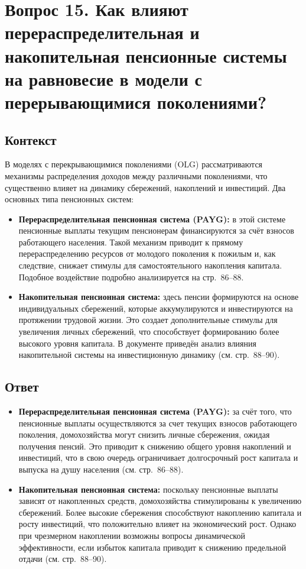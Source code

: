 \section*{Вопрос 15. Как влияют перераспределительная и накопительная пенсионные системы на равновесие в модели с перерывающимися поколениями?}

\subsection*{Контекст}
В моделях с перекрывающимися поколениями (OLG) рассматриваются механизмы распределения доходов между различными 
поколениями, что существенно влияет на динамику сбережений, накоплений и инвестиций. Два основных типа пенсионных систем:
\begin{itemize}
  \item \textbf{Перераспределительная пенсионная система (PAYG):} в этой системе пенсионные выплаты текущим пенсионерам 
  финансируются за счёт взносов работающего населения. Такой механизм приводит к прямому перераспределению ресурсов от 
  молодого поколения к пожилым и, как следствие, снижает стимулы для самостоятельного накопления капитала. Подобное 
  воздействие подробно анализируется на стр.~86--88.
  \item \textbf{Накопительная пенсионная система:} здесь пенсии формируются на основе индивидуальных сбережений, 
  которые аккумулируются и инвестируются на протяжении трудовой жизни. Это создает дополнительные стимулы для увеличения 
  личных сбережений, что способствует формированию более высокого уровня капитала. В документе приведён анализ влияния 
  накопительной системы на инвестиционную динамику (см. стр.~88--90).
\end{itemize}

\subsection*{Ответ}
\begin{itemize}
  \item \textbf{Перераспределительная пенсионная система (PAYG):} за счёт того, что пенсионные выплаты осуществляются 
  за счет текущих взносов работающего поколения, домохозяйства могут снизить личные сбережения, ожидая получения пенсий. 
  Это приводит к снижению общего уровня накоплений и инвестиций, что в свою очередь ограничивает долгосрочный рост капитала 
  и выпуска на душу населения (см. стр.~86--88).
  
  \item \textbf{Накопительная пенсионная система:} поскольку пенсионные выплаты зависят от накопленных средств, домохозяйства 
  стимулированы к увеличению сбережений. Более высокие сбережения способствуют накоплению капитала и росту инвестиций, что 
  положительно влияет на экономический рост. Однако при чрезмерном накоплении возможны вопросы динамической эффективности, 
  если избыток капитала приводит к снижению предельной отдачи (см. стр.~88--90).
\end{itemize}

